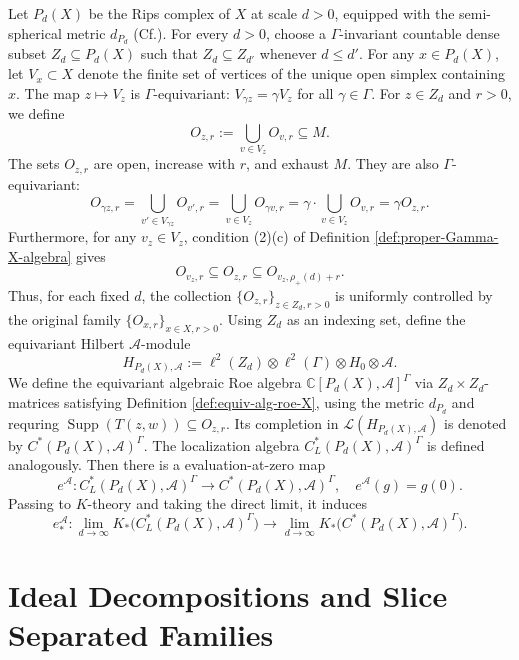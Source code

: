 \documentclass[pdflatex]{sn-jnl}
\theoremstyle{plain}
\theoremstyle{definition}
\def\A{\mathcal{A}}\def\C{\mathcal C}\def\B{\mathcal B}\def\E{\mathcal E}\def\O{\mathcal O}\def\G{\mathcal G}\def\h{\mathfrak h}\def\K{\mathcal K}\def\F{\mathcal F}\def\P{\mathcal P}\def\L{\mathcal{L}}\def\Q{\mathcal Q}\def\H{\mathcal H}\def\S{\mathcal S}\def\N{\mathcal N}\def\U{\mathcal U}\def\I{\mathcal I}\def\Z{\mathcal Z}\def\M{\mathcal M}
\begin{document}
Let $P_{d}(X)$ be the Rips complex of $X$ at scale $d>0$,
equipped with the semi-spherical metric $d_{P_{d}}$ (Cf.\cite{WY2020}). 
For every $d>0$,
choose a $\Gamma$-invariant countable dense subset
$Z_{d}\subseteq P_{d}(X)$
such that
$Z_{d}\subseteq Z_{d'}$ whenever $d\leq d'$.
For any $x\in P_{d}(X)$, let $V_x\subset X$ denote the finite set of vertices of the unique open simplex containing $x$. 
The map $z\mapsto V_z$ is $\Gamma$-equivariant:
$V_{\gamma z}=\gamma V_z$ for all
$\gamma\in\Gamma$. For $z\in Z_{d}$ and $r>0$, we define
\[O_{z,r}:=\bigcup_{v\in V_z}O_{v,r}\subseteq M.
\]
The sets $O_{z,r}$ are open, increase with $r$, and exhaust $M$.
They are also $\Gamma$-equivariant:
\[O_{\gamma z,r}
=\bigcup_{v'\in V_{\gamma z}}O_{v',r}
 =\bigcup_{v\in V_z}O_{\gamma v,r} 
=\gamma\cdot\bigcup_{v\in V_z}O_{v,r}
 =\gamma O_{z,r}.\]
Furthermore, for any $v_z\in V_z$, condition
\textup{(2)(c)} of
Definition \ref{def:proper-Gamma-X-algebra} gives
$$O_{v_z,r}
\subseteq O_{z,r}
\subseteq O_{v_z,\rho_+(d)+r}.$$
Thus, for each fixed $d$, the collection
$\{O_{z,r}\}_{z\in Z_{d},r>0}$ is uniformly controlled by the
original family $\{O_{x,r}\}_{x\in X,r>0}$.
Using $Z_{d}$ as an indexing set, define the equivariant Hilbert
$\mathcal{A}$-module
\[H_{P_{d}(X),\mathcal{A}}
:=
\ell^{2}(Z_{d})\otimes\ell^2(\Gamma)\otimes H_{0}\otimes\mathcal{A}.
\]
We define the equivariant algebraic Roe algebra
$\mathbb{C}[P_{d}(X),\mathcal{A}]^\Gamma$
via $Z_{d}\times Z_{d}$-matrices satisfying Definition \ref{def:equiv-alg-roe-X}, using the metric $d_{P_{d}}$ and requring $\operatorname{Supp}(T(z,w))\subseteq O_{z,r}$.
Its completion in
$\mathcal{L}(H_{P_{d}(X),\mathcal{A}})$ is denoted by
$C^{*}(P_{d}(X),\mathcal{A})^\Gamma$.
The localization algebra
$C_{L}^{*}(P_{d}(X),\mathcal{A})^\Gamma$
is defined analogously. Then there is a evaluation-at-zero map $$e^{\A}:C^{*}_L(P_{d}(X),\mathcal{A})^\Gamma \longrightarrow C^{*}(P_{d}(X),\mathcal{A})^\Gamma,\quad e^{\A}(g)=g(0).$$
Passing to $K$-theory and taking the direct limit, it induces
\begin{equation}\label{(1)(1)}
e_{*}^{\A}:\lim_{d\to\infty}K_{*}\bigl(C^{*}_L(P_{d}(X),\mathcal{A})^{\Gamma}\bigr) \longrightarrow\lim_{d\to\infty}K_{*}\bigl(C^{*}(P_{d}(X),\mathcal{A})^{\Gamma}\bigr).
\end{equation}

\section{Ideal Decompositions and Slice Separated Families}
\end{document}
